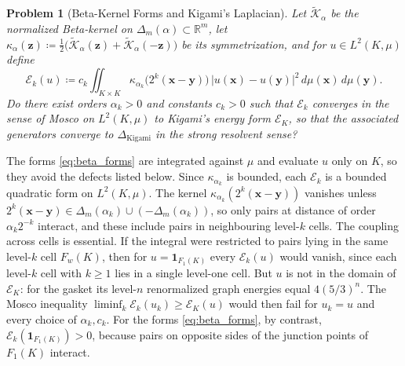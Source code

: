 \documentclass[11pt,a4paper]{article}
\theoremstyle{plain}
\newtheorem{problem}[theorem]{Problem}
\theoremstyle{definition}
\theoremstyle{remark}
\numberwithin{equation}{section}
\begin{document}
\begin{problem}[Beta-Kernel Forms and Kigami's Laplacian]
\label{thm:kigami_convergence}
Let $\widetilde{\mathcal{K}}_\alpha$ be the normalized Beta-kernel on $\Delta_m(\alpha) \subset \mathbb{R}^m$, let $\kappa_\alpha(\mathbf{z}) \coloneqq \frac12\big(\widetilde{\mathcal{K}}_\alpha(\mathbf{z}) + \widetilde{\mathcal{K}}_\alpha(-\mathbf{z})\big)$ be its symmetrization, and for $u \in L^2(K, \mu)$ define
\begin{equation}
\label{eq:beta_forms}
\mathcal{E}_k(u) \coloneqq c_k \iint_{K \times K} \kappa_{\alpha_k}\big(2^k(\mathbf{x} - \mathbf{y})\big)\, |u(\mathbf{x}) - u(\mathbf{y})|^2 \, d\mu(\mathbf{x})\, d\mu(\mathbf{y}).
\end{equation}
Do there exist orders $\alpha_k > 0$ and constants $c_k > 0$ such that $\mathcal{E}_k$ converges in the sense of Mosco on $L^2(K, \mu)$ to Kigami's energy form $\mathcal{E}_K$, so that the associated generators converge to $\Delta_{\text{Kigami}}$ in the strong resolvent sense?
\end{problem}

The forms \eqref{eq:beta_forms} are integrated against $\mu$ and evaluate $u$ only on $K$, so they avoid the defects listed below. Since $\kappa_{\alpha_k}$ is bounded, each $\mathcal{E}_k$ is a bounded quadratic form on $L^2(K,\mu)$. The kernel $\kappa_{\alpha_k}(2^k(\mathbf{x}-\mathbf{y}))$ vanishes unless $2^k(\mathbf{x}-\mathbf{y}) \in \Delta_m(\alpha_k) \cup (-\Delta_m(\alpha_k))$, so only pairs at distance of order $\alpha_k 2^{-k}$ interact, and these include pairs in neighbouring level-$k$ cells. The coupling across cells is essential. If the integral were restricted to pairs lying in the same level-$k$ cell $F_w(K)$, then for $u = \mathbf{1}_{F_1(K)}$ every $\mathcal{E}_k(u)$ would vanish, since each level-$k$ cell with $k \ge 1$ lies in a single level-one cell. But $u$ is not in the domain of $\mathcal{E}_K$: for the gasket its level-$n$ renormalized graph energies equal $4(5/3)^n$. The Mosco inequality $\liminf_k \mathcal{E}_k(u_k) \ge \mathcal{E}_K(u)$ would then fail for $u_k = u$ and every choice of $\alpha_k, c_k$. For the forms \eqref{eq:beta_forms}, by contrast, $\mathcal{E}_k(\mathbf{1}_{F_1(K)}) > 0$, because pairs on opposite sides of the junction points of $F_1(K)$ interact.
\end{document}
